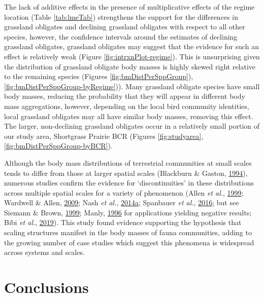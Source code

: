 \documentclass[print]{nuthesis}
\begin{document}
The lack of additive effects in the presence of multiplicative effects of the regime location (Table \ref{tab:lmeTab}) strengthens the support for the differences in grassland obligates and declining grassland obligates with respect to all other species, however, the confidence intervals around the estimates of declining grassland obligates, grassland obligates may suggest that the evidence for such an effect is relatively weak (Figure \ref{fig:intrxnPlot-regime}). This is unsurprising given the distribution of grassland obligate body masses is highly skewed right relative to the remaining species (Figures \ref{fig:bmDistPerSppGroup}), \ref{fig:bmDistPerSppGroup-byRegime})). Many grassland obligate species have small body masses, reducing the probability that they will appear in different body mass aggregations, however, depending on the local bird community identities, local grassland obligates may all have similar body masses, removing this effect. The larger, non-declining grassland obligates occur in a relatively small portion of our study area, Shortgrass Prairie BCR (Figures \ref{fig:studyarea},\ref{fig:bmDistPerSppGroup-byBCR}).

Although the body mass distributions of terrestrial communities at small scales tends to differ from those at larger spatial scales (Blackburn \& Gaston, \protect\hyperlink{ref-blackburn1994animal}{1994}), numerous studies confirm the evidence for `discontinuities' in these distributions across multiple spatial scales for a variety of phenomenon (Allen \emph{et al.}, \protect\hyperlink{ref-allen1999body}{1999}; Wardwell \& Allen, \protect\hyperlink{ref-wardwell2009variability}{2009}; Nash \emph{et al.}, \protect\hyperlink{ref-nash2014discontinuities}{2014}\protect\hyperlink{ref-nash2014discontinuities}{a}; Spanbauer \emph{et al.}, \protect\hyperlink{ref-spanbauer2016body}{2016}; but see Siemann \& Brown, \protect\hyperlink{ref-siemann1999gaps}{1999}; Manly, \protect\hyperlink{ref-manly1996there}{1996} for applications yielding negative results; Bibi \emph{et al.}, \protect\hyperlink{ref-bibi2019body}{2019}). This study found evidence supporting the hypothesis that scaling structures manifest in the body masses of fauna communities, adding to the growing number of case studies which suggest this phenomena is widespread across systems and scales.

\hypertarget{conclusions}{%
\chapter{Conclusions}\label{conclusions}}
\end{document}
